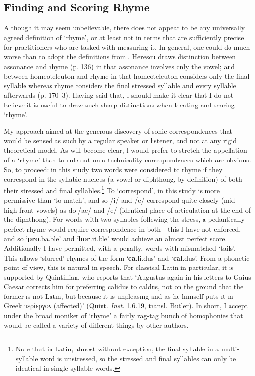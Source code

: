 \documentclass[twocolumn, switch, a4paper]{article} %
\newcommand{\textgreek}[1]{\begingroup\fontencoding{LGR}\selectfont#1\endgroup}
\begin{document}
\subsection{Finding and Scoring Rhyme}
\label{sec:findscore}

Although it may seem unbelievable, there does not appear to be any universally
agreed definition of `rhyme', or at least not in terms that are sufficiently
precise for practitioners who are tasked with measuring it. In general, one
could do much worse than to adopt the definitions from
. Herescu draws distinction between assonance and
rhyme (p. 136) in that assonance involves only the vowel; and between
homeoteleuton and rhyme in that homeoteleuton considers only the final
syllable whereas rhyme considers the final stressed syllable and every
syllable afterwards (p. 170--3). Having said that, I should make it clear that
I do not believe it is useful to draw such sharp distinctions when locating
and scoring `rhyme'.

My approach aimed at the generous discovery of sonic correspondences that
would be sensed as such by a regular speaker or listener, and not at any rigid
theoretical model. As will become clear, I would prefer to stretch the
appellation of a `rhyme' than to rule out on a technicality correspondences
which are obvious. So, to proceed: in this study two words were considered to
rhyme if they correspond in the syllabic nucleus (a vowel or diphthong, by
definition) of both their stressed and final syllables.\footnote{
  Note that in Latin, almost without exception, the final syllable in a
  multi-syllable word is unstressed, so the stressed and final syllables
  can only be identical in single syllable words. 
}
To `correspond', in this study is more permissive than `to match', and so /i/
and /e/ correspond quite closely (mid--high front vowels) as do /ae/ and /e/
(identical place of articulation at the end of the diphthong). For words with
two syllables following the stress, a pedantically perfect rhyme would require
correspondence in both---this I have not enforced, and so
`\textbf{pro}.ba.ble' and `\textbf{hor}.ri.ble' would achieve an almost
perfect score. Additionally I have permitted, with a penalty, words with
mismatched `tails'. This allows `slurred' rhymes of the form
`\textbf{ca}.li.dus' and `\textbf{cal}.dus'. From a phonetic point of view,
this is natural in speech. For classical Latin in particular, it is supported
by Quintillian, who reports that `Augustus again in his letters to Gaius
Caesar corrects him for preferring calidus to caldus, not on the ground that
the former is not Latin, but because it is unpleasing and as he himself puts
it in Greek \textgreek{περίεργον} (affected)' (Quint. \emph{Inst.} 1.6.19,
transl. Butler). In short, I accept under the broad moniker of `rhyme' a
fairly rag-tag bunch of homophonies that would be called a variety of
different things by other authors.
\end{document}
